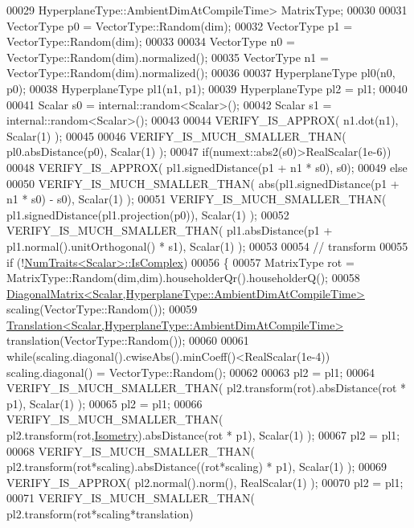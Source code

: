 \begin{DoxyCode}
00029                          HyperplaneType::AmbientDimAtCompileTime> MatrixType;
00030 
00031   VectorType p0 = VectorType::Random(dim);
00032   VectorType p1 = VectorType::Random(dim);
00033 
00034   VectorType n0 = VectorType::Random(dim).normalized();
00035   VectorType n1 = VectorType::Random(dim).normalized();
00036 
00037   HyperplaneType pl0(n0, p0);
00038   HyperplaneType pl1(n1, p1);
00039   HyperplaneType pl2 = pl1;
00040 
00041   Scalar s0 = internal::random<Scalar>();
00042   Scalar s1 = internal::random<Scalar>();
00043 
00044   VERIFY\_IS\_APPROX( n1.dot(n1), Scalar(1) );
00045 
00046   VERIFY\_IS\_MUCH\_SMALLER\_THAN( pl0.absDistance(p0), Scalar(1) );
00047   \textcolor{keywordflow}{if}(numext::abs2(s0)>RealScalar(1e-6))
00048     VERIFY\_IS\_APPROX( pl1.signedDistance(p1 + n1 * s0), s0);
00049   \textcolor{keywordflow}{else}
00050     VERIFY\_IS\_MUCH\_SMALLER\_THAN( abs(pl1.signedDistance(p1 + n1 * s0) - s0), Scalar(1) );
00051   VERIFY\_IS\_MUCH\_SMALLER\_THAN( pl1.signedDistance(pl1.projection(p0)), Scalar(1) );
00052   VERIFY\_IS\_MUCH\_SMALLER\_THAN( pl1.absDistance(p1 +  pl1.normal().unitOrthogonal() * s1), Scalar(1) );
00053 
00054   \textcolor{comment}{// transform}
00055   \textcolor{keywordflow}{if} (!\hyperlink{group___core___module_struct_eigen_1_1_num_traits}{NumTraits<Scalar>::IsComplex})
00056   \{
00057     MatrixType rot = MatrixType::Random(dim,dim).householderQr().householderQ();
00058     \hyperlink{group___core___module_class_eigen_1_1_diagonal_matrix}{DiagonalMatrix<Scalar,HyperplaneType::AmbientDimAtCompileTime>}
       scaling(VectorType::Random());
00059     \hyperlink{group___geometry___module_class_eigen_1_1_translation}{Translation<Scalar,HyperplaneType::AmbientDimAtCompileTime>}
       translation(VectorType::Random());
00060     
00061     \textcolor{keywordflow}{while}(scaling.diagonal().cwiseAbs().minCoeff()<RealScalar(1e-4)) scaling.diagonal() = 
      VectorType::Random();
00062 
00063     pl2 = pl1;
00064     VERIFY\_IS\_MUCH\_SMALLER\_THAN( pl2.transform(rot).absDistance(rot * p1), Scalar(1) );
00065     pl2 = pl1;
00066     VERIFY\_IS\_MUCH\_SMALLER\_THAN( pl2.transform(rot,\hyperlink{group__enums_ggaee59a86102f150923b0cac6d4ff05107a080cd5366173608f701cd945c2335568}{Isometry}).absDistance(rot * p1), Scalar(1) );
00067     pl2 = pl1;
00068     VERIFY\_IS\_MUCH\_SMALLER\_THAN( pl2.transform(rot*scaling).absDistance((rot*scaling) * p1), Scalar(1) );
00069     VERIFY\_IS\_APPROX( pl2.normal().norm(), RealScalar(1) );
00070     pl2 = pl1;
00071     VERIFY\_IS\_MUCH\_SMALLER\_THAN( pl2.transform(rot*scaling*translation)

\end{DoxyCode}
